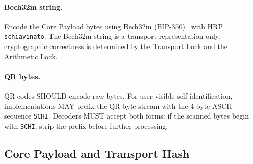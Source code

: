 \documentclass[11pt]{article}
\begin{document}
\paragraph{Bech32m string.} Encode the Core Payload bytes using Bech32m (BIP-350)~\cite{bip350} with HRP \texttt{schiavinato}. The Bech32m string is a transport representation only; cryptographic correctness is determined by the Transport Lock and the Arithmetic Lock.

\paragraph{QR bytes.} QR codes SHOULD encode raw bytes. For user-visible self-identification, implementations MAY prefix the QR byte stream with the 4-byte ASCII sequence \texttt{SCHI}. Decoders MUST accept both forms: if the scanned bytes begin with \texttt{SCHI}, strip the prefix before further processing.

\subsection{Core Payload and Transport Hash}
\end{document}

